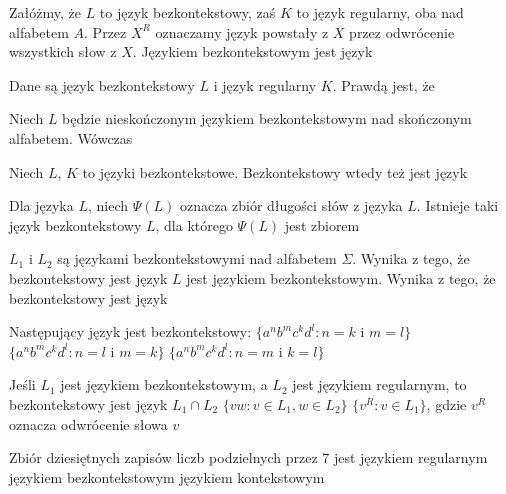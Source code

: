 \begin{problems}

\prob Załóżmy, że $L$ to język bezkontekstowy, zaś $K$ to język regularny, oba nad alfabetem $A$. Przez $X^R$ oznaczamy język powstały z $X$ przez odwrócenie wszystkich słow z $X$. Językiem bezkontekstowym jest język

\prob Dane są język bezkontekstowy $L$ i język regularny $K$. Prawdą jest, że

\prob Niech $L$ będzie nieskończonym językiem bezkontekstowym nad skończonym alfabetem. Wówczas

\prob Niech $L$, $K$ to języki bezkontekstowe. Bezkontekstowy wtedy też jest język

\prob Dla języka $L$, niech $\Psi(L)$ oznacza zbiór długości słów z języka $L$. Istnieje taki język bezkontekstowy $L$, dla którego $\Psi(L)$ jest zbiorem

\prob $L_1$ i $L_2$ są językami bezkontekstowymi nad alfabetem $\Sigma$. Wynika z tego, że bezkontekstowy jest język
\prob $L$ jest językiem bezkontekstowym. Wynika z tego, że bezkontekstowy jest język
    
\prob Następujący język jest bezkontekstowy:
    \answers
    {$\{a^nb^mc^kd^l : n = k \text{ i } m = l\}$}
    {$\{a^nb^mc^kd^l : n = l \text{ i } m = k\}$}
    {$\{a^nb^mc^kd^l :n=m \text{ i } k=l\}$}
    
\prob Jeśli $L_1$ jest językiem bezkontekstowym, a $L_2$ jest językiem regularnym, to bezkontekstowy jest język
    \answers
    {$L_1 \cap L_2$}
    {$\{vw : v \in L_1, w \in L_2\}$}
    {$\{v^R : v \in L_1\}$, gdzie $v^R$ oznacza odwrócenie słowa $v$}

\prob Zbiór dziesiętnych zapisów liczb podzielnych przez 7 jest
    \answers
    {językiem regularnym}
    {językiem bezkontekstowym}
    {językiem kontekstowym}
\end{problems}

